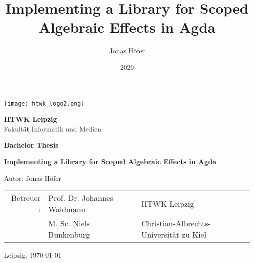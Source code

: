 \documentclass[10pt,a4paper,twoside,notitlepage]{report}
\title{Implementing a Library for Scoped Algebraic Effects in Agda}
\author{Jonas Höfer}
\date{2020}
\begin{document}
\begin{titlepage}
  \begin{large}
    \begin{center}

      \texttt{[image: htwk\_logo2.png]}

      \vskip 2cm

      \textbf{HTWK Leipzig}\\
      Fakultät Informatik und Medien\\

      \vskip 2cm

      \textbf{Bachelor Thesis}

      \vskip 2cm

      \textbf{Implementing a Library for Scoped Algebraic Effects in Agda}\\

      \vfill

      Autor: Jonas Höfer\\

      \vskip 2cm

      \begin{tabular}{rll}
         Betreuer : & Prof. Dr. Johannes Waldmann & HTWK Leipzig\\
                    & M. Sc. Niels Bunkenburg     & Christian-Albrechts-Universität zu Kiel\\
      \end{tabular}

      \vskip 2cm

      Leipzig, \today\\

    \end{center}
  \end{large}
\end{titlepage}
\end{document}
